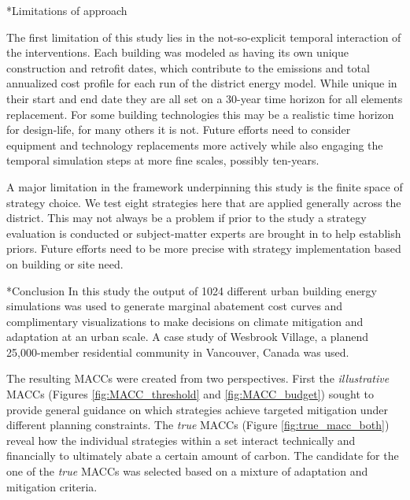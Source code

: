 \documentclass[twocolumn, a4paper,10pt]{article}
\makeatletter
\renewcommand\section{\@startsection{section}{1}{\z@}{3pt}{3pt}{\normalfont\large\bfseries}}
\renewcommand\subsection{\@startsection{subsection}{1}{\z@}{\z@}{\z@}{\normalfont\normalsize\bfseries}}
\renewcommand\subsection{\@startsection{subsection}{1}{\z@}{\z@}{0.1pt}{\normalfont\normalsize\bfseries}}
\makeatother
\begin{document}

\subsection*{Limitations of approach}

The first limitation of this study lies in the not-so-explicit temporal interaction of the interventions. Each building was modeled as having its own unique construction and retrofit dates, which contribute to the emissions and total annualized cost profile for each run of the district energy model. While unique in their start and end date they are all set on a 30-year time horizon for all elements replacement. For some building technologies this may be a realistic time horizon for design-life, for many others it is not. Future efforts need to consider equipment and technology replacements more actively while also engaging the temporal simulation steps at more fine scales, possibly ten-years.

A major limitation in the framework underpinning this study is the finite space of strategy choice. We test eight strategies here that are applied generally across the district. This may not always be a problem if prior to the study a strategy evaluation is conducted or subject-matter experts are brought in to help establish priors. Future efforts need to be more precise with strategy implementation based on building or site need. 

\section*{Conclusion}
In this study the output of 1024 different urban building energy simulations was used to generate marginal abatement cost curves and complimentary visualizations to make decisions on climate mitigation and adaptation at an urban scale. A case study of Wesbrook Village, a planend 25,000-member residential community in Vancouver, Canada was used.

The resulting MACCs were created from two perspectives. First the \textit{illustrative} MACCs (Figures \ref{fig:MACC_threshold} and \ref{fig:MACC_budget}) sought to provide general guidance on which strategies achieve targeted mitigation under different planning constraints. The \textit{true} MACCs (Figure \ref{fig:true_macc_both}) reveal how the individual strategies within a set interact technically and financially to ultimately abate a certain amount of carbon. The candidate for the one of the \textit{true} MACCs was selected based on a mixture of adaptation and mitigation criteria. 
\end{document}
